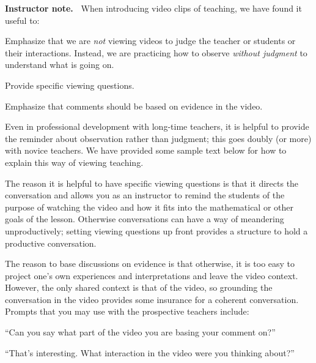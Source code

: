 \documentclass[11pt]{article}
\newenvironment{bignote}[1][Instructor note]%
	{\begin{mdframed}\raggedright{\bf #1.~}}
	{\end{mdframed}}
\theoremstyle{definition}
\begin{document}
\begin{bignote}
When introducing video clips of teaching, we have found it useful to:
	\begin{itemize*}
	\item Emphasize that we are {\it not} viewing videos to judge the teacher or students or their interactions. Instead, we are practicing how to observe {\it without judgment} to understand what is going on.
	\item Provide specific viewing questions.
	\item Emphasize that comments should be based on evidence in the video.
	\end{itemize*}
	
Even in professional development with long-time teachers, it is helpful to provide the reminder about observation rather than judgment; this goes doubly (or more) with novice teachers. We have provided some sample text below for how to explain this way of viewing teaching.

The reason it is helpful to have specific viewing questions is that it directs the conversation and allows you as an instructor to remind the students of the purpose of watching the video and how it fits into the mathematical or other goals of the lesson. Otherwise conversations can have a way of meandering unproductively; setting viewing questions up front provides a structure to hold a productive conversation.

The reason to base discussions on evidence is that otherwise, it is too easy to project one's own experiences and interpretations and leave the video context. However, the only shared context is that of the video, so grounding the conversation in the video provides some insurance for a coherent conversation. Prompts that you may use with the prospective teachers include:
	\begin{itemize*}
	\item ``Can you say what part of the video you are basing your comment on?''
	\item ``That's interesting. What interaction in the video were you thinking about?''
	\end{itemize*}
\end{bignote}
\end{document}
